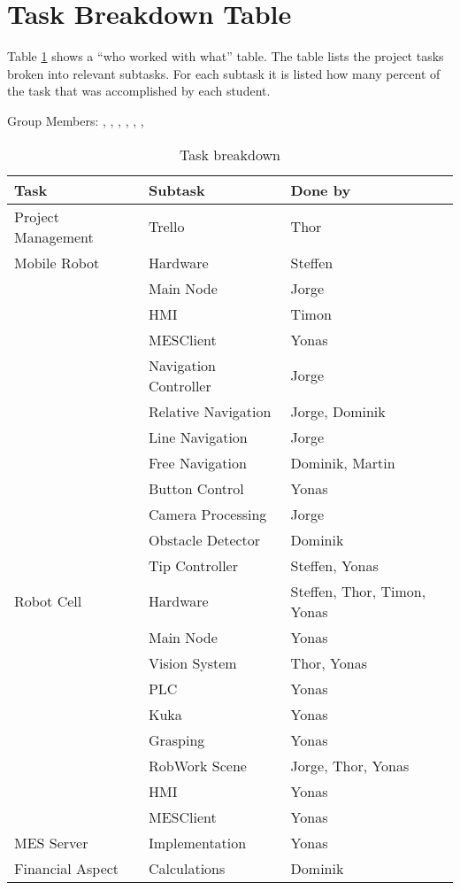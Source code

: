 \section{Task Breakdown Table \label{sec:tasks}}

Table \ref{tab:taks_breakdown} shows a “who worked with what” table. The table lists the project tasks broken into relevant subtasks. For each subtask it is listed how many percent of the task that was accomplished by each student.

\newpage 
Group Members: \authorOne, \authorTwo, \authorThree, \authorFour, \authorFive, \authorSix, \authorSeven

\begin{table}[!h]
\centering
\begin{tabular}{lll}
\textbf{Task} & \textbf{Subtask} & \textbf{Done by} \\ \hline
Project Management     & Trello & Thor        \\ \hline
Mobile Robot & Hardware & Steffen        \\ \hline
 & Main Node & Jorge        \\ \hline
 & HMI & Timon        \\ \hline 
 & MESClient & Yonas        \\ \hline  
 & Navigation Controller & Jorge        \\ \hline 
 & Relative Navigation & Jorge, Dominik        \\ \hline
 & Line Navigation & Jorge        \\ \hline
 & Free Navigation & Dominik, Martin      \\ \hline
 & Button Control & Yonas        \\ \hline
 & Camera Processing & Jorge       \\ \hline
 & Obstacle Detector & Dominik        \\ \hline 
 & Tip Controller & Steffen, Yonas        \\ \hline 
Robot Cell & Hardware & Steffen, Thor, Timon, Yonas \\ \hline
 & Main Node & Yonas        \\ \hline
 & Vision System & Thor, Yonas       \\ \hline
 & PLC & Yonas        \\ \hline
 & Kuka & Yonas      \\ \hline
 & Grasping & Yonas        \\ \hline
 & RobWork Scene & Jorge, Thor, Yonas         \\ \hline
 & HMI & Yonas         \\ \hline
 & MESClient & Yonas        \\ \hline
MES Server & Implementation & Yonas        \\ \hline
Financial Aspect & Calculations & Dominik        \\ \hline
\end{tabular}
\caption{Task breakdown}
\label{tab:taks_breakdown}
\end{table}